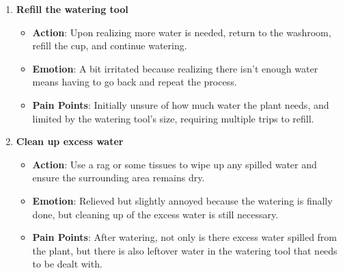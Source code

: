 \documentclass[math,code]{amznotes}
\theoremstyle{remark}
\begin{document}
\begin{enumerate}
\begin{itemize}
    \end{itemize}
    \item \textbf{Refill the watering tool}
    \begin{itemize}
        \item \textbf{Action}: Upon realizing more water is needed, return to the washroom, refill the cup, and continue watering.
        \item \textbf{Emotion}: A bit irritated because realizing there isn’t enough water means having to go back and repeat the process.
        \item \textbf{Pain Points}: Initially unsure of how much water the plant needs, and limited by the watering tool's size, requiring multiple trips to refill.
    \end{itemize}
    \item \textbf{Clean up excess water}
    \begin{itemize}
        \item \textbf{Action}: Use a rag or some tissues to wipe up any spilled water and ensure the surrounding area remains dry.
        \item \textbf{Emotion}: Relieved but slightly annoyed because the watering is finally done, but cleaning up of the excess water is still necessary.
        \item \textbf{Pain Points}: After watering, not only is there excess water spilled from the plant, but there is also leftover water in the watering tool that needs to be dealt with.
    \end{itemize}
\end{enumerate}
\end{document}
